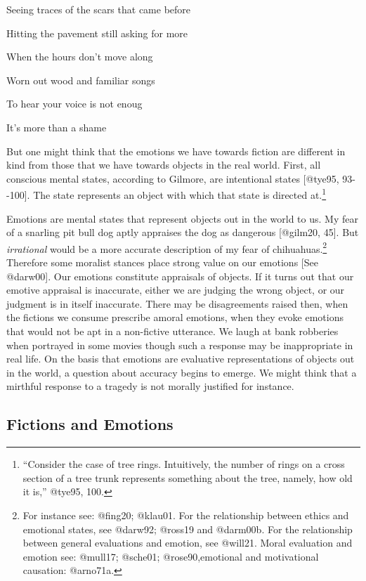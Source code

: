 \documentclass[
  letterpaper,
  DIV=11,
  numbers=noendperiod]{scrartcl}
\theoremstyle{remark}
\begin{document}
Seeing traces of the scars that came before

Hitting the pavement still asking for more

When the hours don't move along

Worn out wood and familiar songs

To hear your voice is not enoug

It's more than a shame

But one might think that the emotions we have towards fiction are
different in kind from those that we have towards objects in the real
world. First, all conscious mental states, according to Gilmore, are
intentional states {[}@tye95, 93-\/-100{]}. The state represents an
object with which that state is directed at.\footnote{``Consider the
  case of tree rings. Intuitively, the number of rings on a cross
  section of a tree trunk represents something about the tree, namely,
  how old it is,'' @tye95, 100.}

Emotions are mental states that represent objects out in the world to
us. My fear of a snarling pit bull dog aptly appraises the dog as
dangerous {[}@gilm20, 45{]}. But \emph{irrational} would be a more
accurate description of my fear of chihuahuas.\footnote{For instance
  see: @fing20; @klau01. For the relationship between ethics and
  emotional states, see @darw92; @ross19 and @darm00b. For the
  relationship between general evaluations and emotion, see @will21.
  Moral evaluation and emotion see: @mull17; @sche01; @rose90,emotional
  and motivational causation: @arno71a.} Therefore some moralist stances
place strong value on our emotions {[}See @darw00{]}. Our emotions
constitute appraisals of objects. If it turns out that our emotive
appraisal is inaccurate, either we are judging the wrong object, or our
judgment is in itself inaccurate. There may be disagreements raised
then, when the fictions we consume prescribe amoral emotions, when they
evoke emotions that would not be apt in a non-fictive utterance. We
laugh at bank robberies when portrayed in some movies though such a
response may be inappropriate in real life. On the basis that emotions
are evaluative representations of objects out in the world, a question
about accuracy begins to emerge. We might think that a mirthful response
to a tragedy is not morally justified for instance.

\subsection{Fictions and Emotions}\label{fictions-and-emotions}
\end{document}
